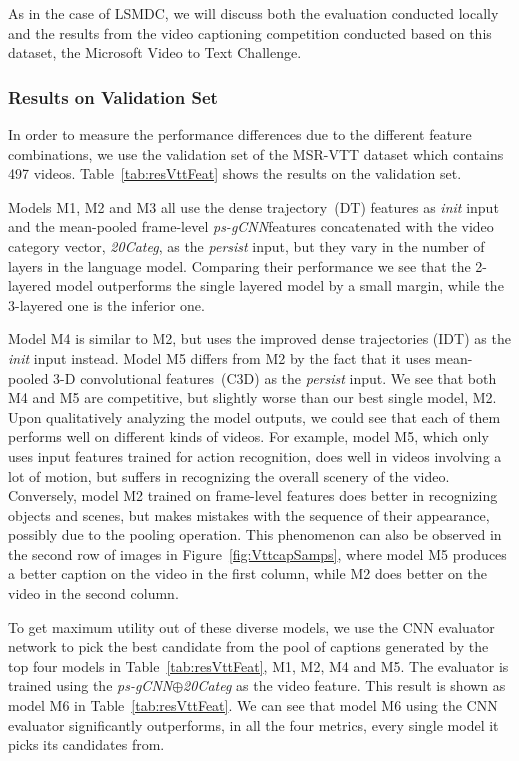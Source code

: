 As in the case of LSMDC, we will discuss both the evaluation conducted locally
and the results from the video captioning competition conducted based on this
dataset, the Microsoft Video to Text Challenge.

\subsubsection{Results on Validation Set}
In order to measure the performance differences due to the different feature
combinations, we use the validation set of the MSR-VTT
dataset which contains 497 videos.
Table~\ref{tab:resVttFeat} shows the results on the validation set.

Models M1, M2 and M3 all use the dense trajectory~(DT) features as \emph{init}
input and the mean-pooled frame-level \emph{ps-gCNN}features concatenated with
the video category vector, \emph{20Categ}, as the \emph{persist} input, but they
vary in the number of layers in the language model.
Comparing their performance we see that the 2-layered model outperforms the single
layered model by a small margin, while the 3-layered one is the inferior one.

Model M4 is similar to M2, but uses the improved dense trajectories (IDT) as
the \emph{init} input instead.
Model M5 differs from M2 by the fact that it uses mean-pooled 3-D
convolutional features~(C3D) as the \emph{persist} input.
We see that both M4 and M5 are competitive, but slightly worse than our best
single model, M2.
Upon qualitatively analyzing the model outputs, we could see that each of them
performs well on different kinds of videos.
For example, model M5, which only uses input features trained for action
recognition, does well in videos involving a lot of motion, but suffers in
recognizing the overall scenery of the video.
Conversely, model M2 trained on frame-level features does better in recognizing
objects and scenes, but makes mistakes with the sequence of their appearance,
possibly due to the pooling operation.
This phenomenon can also be observed in the second row of images in
Figure~\ref{fig:VttcapSamps}, where model M5 produces a better caption on the
video in the first column, while M2 does better on the video in the second
column.

To get maximum utility out of these diverse models, we use the CNN evaluator
network to pick the best candidate from the pool of captions generated by the
top four models in Table~\ref{tab:resVttFeat}, M1, M2, M4 and M5.
The evaluator is trained using the \emph{ps-gCNN$\oplus$20Categ} as the video
feature.
This result is shown as model M6 in Table~\ref{tab:resVttFeat}.
We can see that model M6 using the CNN evaluator significantly outperforms, in
all the four metrics, every single model it picks its candidates from.

